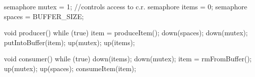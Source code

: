 \documentclass[varwidth=28em,crop]{standalone}
\begin{document}
\begin{ccode}
semaphore mutex = 1; //controls access to c.r.
semaphore items = 0;
semaphore spaces = BUFFER_SIZE;        
\end{ccode}
\begin{minipage}{.42\linewidth}
\vspace{1em}
\begin{ccode}
void producer() {
  while (true) {
    item = produceItem();
    down(spaces);
    down(mutex);
    putIntoBuffer(item);
    up(mutex);
    up(items);
  }
}      
\end{ccode}
\end{minipage}\qquad
\begin{minipage}{.48\linewidth}
\vspace{1em}
\begin{ccode}
void consumer() {
  while (true) {
    down(items);
    down(mutex);
    item = rmFromBuffer();
    up(mutex);
    up(spaces);
    consumeItem(item);
  }
}      
\end{ccode}  
\end{minipage}
\end{document}
